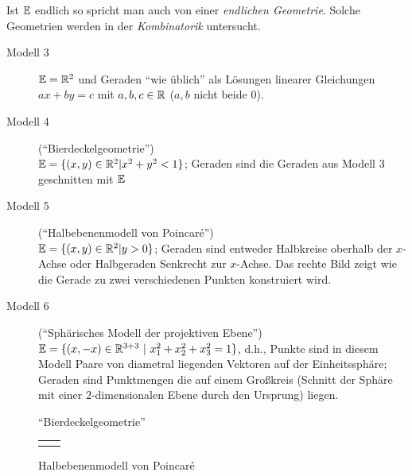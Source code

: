 Ist $\mathbb E$ endlich so spricht man auch von einer {\em endlichen Geometrie}.  Solche Geometrien werden
in der {\em Kombinatorik} untersucht.

\begin{description}
    \item[Modell 3] $\mathbb E=\mathbb R^2$ und Geraden "`wie üblich"' als Lösungen linearer Gleichungen
        $a x + b y = c$ mit $a,b,c\in \mathbb R$ ($a,b$ nicht beide $0$).

    \item[Modell 4] ("`Bierdeckelgeometrie"')\\ %
        $\mathbb E=\{ (x,y)\in\mathbb R^2 | x^2+y^2<1 \}$; Geraden sind die Geraden aus Modell 3 geschnitten mit
        $\mathbb E$

    \item[Modell 5] ("`Halbebenenmodell von Poincaré"')\\
        $\mathbb E=\{ (x,y)\in\mathbb R^2 | y>0 \}$; Geraden sind entweder Halbkreise oberhalb der $x$-Achse oder
        Halbgeraden Senkrecht zur $x$-Achse. Das rechte Bild zeigt wie die Gerade zu zwei
        verschiedenen Punkten konstruiert wird.

    \item[Modell 6] ("`Sphärisches Modell der projektiven Ebene"')\\
        $\mathbb E=\{ (x,-x)\in\mathbb R^{3+3} \ | \ x_1^2+  x_2^2 + x_3^2= 1 \}$, d.h., Punkte sind in diesem
        Modell Paare von diametral liegenden Vektoren auf der Einheitssphäre; Geraden sind
        Punktmengen die auf einem Großkreis (Schnitt der Sphäre mit einer $2$-dimensionalen Ebene
        durch den Ursprung) liegen.
\end{description}

\begin{figure}[h]
    
    \caption{"`Bierdeckelgeometrie"'}
\end{figure}

\begin{figure}[h]
    \begin{tabular}{cc}
        
        &
        
    \end{tabular}
    \caption{Halbebenenmodell von Poincaré}
\end{figure}



